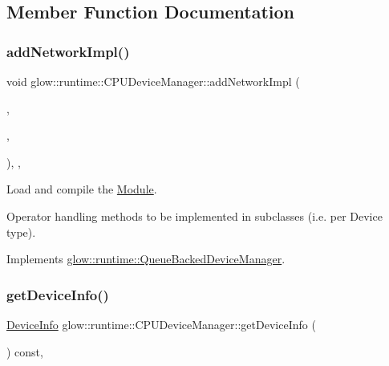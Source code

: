 \subsection{Member Function Documentation}
\mbox{\label{classglow_1_1runtime_1_1_c_p_u_device_manager_a00e9a9c52e5f56bb5844af7b2e0e682e}} 
\subsubsection{\texorpdfstring{add\+Network\+Impl()}{addNetworkImpl()}}
{\footnotesize\ttfamily void glow\+::runtime\+::\+C\+P\+U\+Device\+Manager\+::add\+Network\+Impl (\begin{DoxyParamCaption}\item[{const \hyperlink{classglow_1_1_module}{Module} $\ast$}]{,  }\item[{Function\+Map\+Ty}]{,  }\item[{Ready\+C\+B\+Ty}]{ }\end{DoxyParamCaption})\hspace{0.3cm}{\ttfamily [override]}, {\ttfamily [protected]}, {\ttfamily [virtual]}}



Load and compile the \hyperlink{classglow_1_1_module}{Module}. 

Operator handling methods to be implemented in subclasses (i.\+e. per Device type). 

Implements \hyperlink{classglow_1_1runtime_1_1_queue_backed_device_manager_a47a2b12e364f822961c904c7c123924a}{glow\+::runtime\+::\+Queue\+Backed\+Device\+Manager}.

\mbox{\label{classglow_1_1runtime_1_1_c_p_u_device_manager_af2ab7f66e45a81dd9fe1f2ad4054bc6c}} 
\subsubsection{\texorpdfstring{get\+Device\+Info()}{getDeviceInfo()}}
{\footnotesize\ttfamily \hyperlink{structglow_1_1runtime_1_1_device_info}{Device\+Info} glow\+::runtime\+::\+C\+P\+U\+Device\+Manager\+::get\+Device\+Info (\begin{DoxyParamCaption}{ }\end{DoxyParamCaption}) const\hspace{0.3cm}{\ttfamily [override]}, {\ttfamily [virtual]}}

